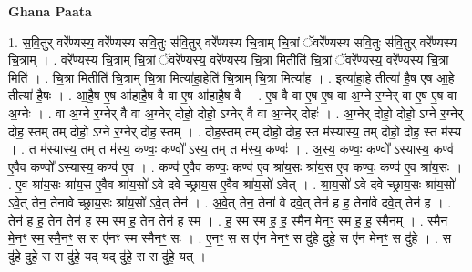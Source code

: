 \documentclass[17pt]{extarticle}
\begin{document}
\textbf{Ghana Paata } \newline

1. स॒वि॒तुर् वरे᳚ण्यस्य॒ वरे᳚ण्यस्य सवि॒तुः स॑वि॒तुर् वरे᳚ण्यस्य चि॒त्राम् चि॒त्रां ॅवरे᳚ण्यस्य सवि॒तुः स॑वि॒तुर् वरे᳚ण्यस्य चि॒त्राम् । . वरे᳚ण्यस्य चि॒त्राम् चि॒त्रां ॅवरे᳚ण्यस्य॒ वरे᳚ण्यस्य चि॒त्रा मितीति॑ चि॒त्रां ॅवरे᳚ण्यस्य॒ वरे᳚ण्यस्य चि॒त्रा मिति॑ । . चि॒त्रा मितीति॑ चि॒त्राम् चि॒त्रा मित्या॑हा॒हेति॑ चि॒त्राम् चि॒त्रा मित्या॑ह । . इत्या॑हा॒हे तीत्या॑ है॒ष ए॒ष आ॒हे तीत्या॑ है॒षः । . आ॒है॒ष ए॒ष आ॑हाहै॒ष वै वा ए॒ष आ॑हाहै॒ष वै । . ए॒ष वै वा ए॒ष ए॒ष वा अ॒ग्ने र॒ग्नेर् वा ए॒ष ए॒ष वा अ॒ग्नेः । . वा अ॒ग्ने र॒ग्नेर् वै वा अ॒ग्नेर् दोहो॒ दोहो॒ ऽग्नेर् वै वा अ॒ग्नेर् दोहः॑ । . अ॒ग्नेर् दोहो॒ दोहो॒ ऽग्ने र॒ग्नेर् दोह॒ स्तम् तम् दोहो॒ ऽग्ने र॒ग्नेर् दोह॒ स्तम् । . दोह॒स्तम् तम् दोहो॒ दोह॒ स्त म॑स्यास्य॒ तम् दोहो॒ दोह॒ स्त म॑स्य । . त म॑स्यास्य॒ तम् त म॑स्य॒ कण्वः॒ कण्वो᳚ ऽस्य॒ तम् त म॑स्य॒ कण्वः॑ । . अ॒स्य॒ कण्वः॒ कण्वो᳚ ऽस्यास्य॒ कण्व॑ ए॒वैव कण्वो᳚ ऽस्यास्य॒ कण्व॑ ए॒व । . कण्व॑ ए॒वैव कण्वः॒ कण्व॑ ए॒व श्रा॑य॒सः श्रा॑य॒स ए॒व कण्वः॒ कण्व॑ ए॒व श्रा॑य॒सः । . ए॒व श्रा॑य॒सः श्रा॑य॒स ए॒वैव श्रा॑य॒सो॑ ऽवे दवे च्छ्राय॒स ए॒वैव श्रा॑य॒सो॑ ऽवेत् । . श्रा॒य॒सो॑ ऽवे दवे च्छ्राय॒सः श्रा॑य॒सो॑ ऽवे॒त् तेन॒ तेना॑वे च्छ्राय॒सः श्रा॑य॒सो॑ ऽवे॒त् तेन॑ । . अ॒वे॒त् तेन॒ तेना॑ वे दवे॒त् तेन॑ ह ह॒ तेना॑वे दवे॒त् तेन॑ ह । . तेन॑ ह ह॒ तेन॒ तेन॑ ह स्म स्म ह॒ तेन॒ तेन॑ ह स्म । . ह॒ स्म॒ स्म॒ ह॒ ह॒ स्मै॒न॒ मे॒नꣳ॒॒ स्म॒ ह॒ ह॒ स्मै॒न॒म् । . स्मै॒न॒ मे॒नꣳ॒॒ स्म॒ स्मै॒नꣳ॒॒ स स ए॑नꣳ स्म स्मैनꣳ॒॒ सः । . ए॒नꣳ॒॒ स स ए॑न मेनꣳ॒॒ स दु॑हे दुहे॒ स ए॑न मेनꣳ॒॒ स दु॑हे । . स दु॑हे दुहे॒ स स दु॑हे॒ यद् यद् दु॑हे॒ स स दु॑हे॒ यत् । \newline
\end{document}
